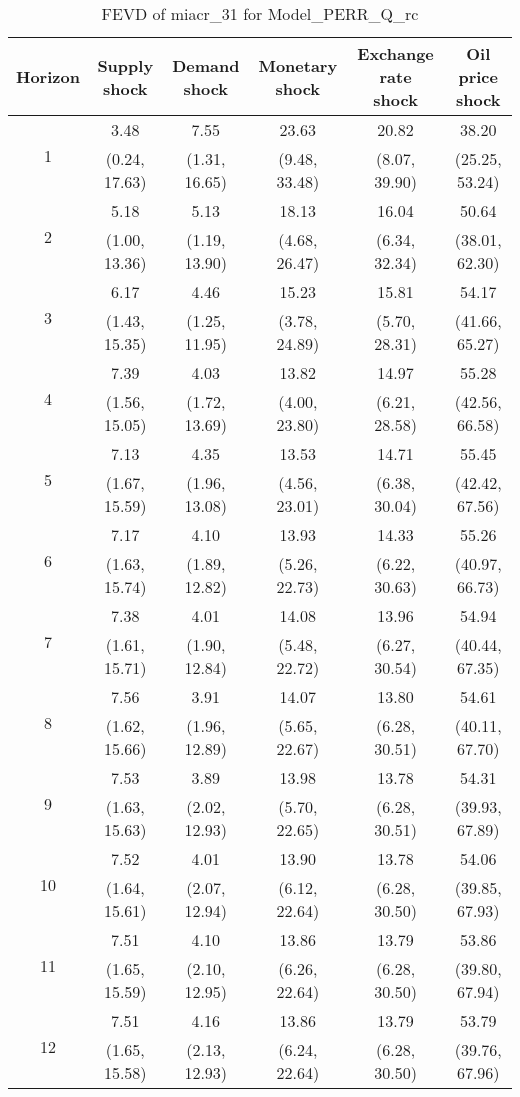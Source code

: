 \documentclass{article}
\begin{document}
\begin{table}
	\footnotesize
	\caption{FEVD of miacr_31 for Model_PERR_Q_rc}
	\begin{tabular}{cccccc}
		Horizon & Supply shock & Demand shock & Monetary shock & Exchange rate shock & Oil price shock\\ \hline
		\multirow{2}{*}{1} & 3.48 & 7.55 & 23.63 & 20.82 & 38.20\\
		 & (0.24, 17.63) & (1.31, 16.65) & (9.48, 33.48) & (8.07, 39.90) & (25.25, 53.24)\\
		\multirow{2}{*}{2} & 5.18 & 5.13 & 18.13 & 16.04 & 50.64\\
		 & (1.00, 13.36) & (1.19, 13.90) & (4.68, 26.47) & (6.34, 32.34) & (38.01, 62.30)\\
		\multirow{2}{*}{3} & 6.17 & 4.46 & 15.23 & 15.81 & 54.17\\
		 & (1.43, 15.35) & (1.25, 11.95) & (3.78, 24.89) & (5.70, 28.31) & (41.66, 65.27)\\
		\multirow{2}{*}{4} & 7.39 & 4.03 & 13.82 & 14.97 & 55.28\\
		 & (1.56, 15.05) & (1.72, 13.69) & (4.00, 23.80) & (6.21, 28.58) & (42.56, 66.58)\\
		\multirow{2}{*}{5} & 7.13 & 4.35 & 13.53 & 14.71 & 55.45\\
		 & (1.67, 15.59) & (1.96, 13.08) & (4.56, 23.01) & (6.38, 30.04) & (42.42, 67.56)\\
		\multirow{2}{*}{6} & 7.17 & 4.10 & 13.93 & 14.33 & 55.26\\
		 & (1.63, 15.74) & (1.89, 12.82) & (5.26, 22.73) & (6.22, 30.63) & (40.97, 66.73)\\
		\multirow{2}{*}{7} & 7.38 & 4.01 & 14.08 & 13.96 & 54.94\\
		 & (1.61, 15.71) & (1.90, 12.84) & (5.48, 22.72) & (6.27, 30.54) & (40.44, 67.35)\\
		\multirow{2}{*}{8} & 7.56 & 3.91 & 14.07 & 13.80 & 54.61\\
		 & (1.62, 15.66) & (1.96, 12.89) & (5.65, 22.67) & (6.28, 30.51) & (40.11, 67.70)\\
		\multirow{2}{*}{9} & 7.53 & 3.89 & 13.98 & 13.78 & 54.31\\
		 & (1.63, 15.63) & (2.02, 12.93) & (5.70, 22.65) & (6.28, 30.51) & (39.93, 67.89)\\
		\multirow{2}{*}{10} & 7.52 & 4.01 & 13.90 & 13.78 & 54.06\\
		 & (1.64, 15.61) & (2.07, 12.94) & (6.12, 22.64) & (6.28, 30.50) & (39.85, 67.93)\\
		\multirow{2}{*}{11} & 7.51 & 4.10 & 13.86 & 13.79 & 53.86\\
		 & (1.65, 15.59) & (2.10, 12.95) & (6.26, 22.64) & (6.28, 30.50) & (39.80, 67.94)\\
		\multirow{2}{*}{12} & 7.51 & 4.16 & 13.86 & 13.79 & 53.79\\
		 & (1.65, 15.58) & (2.13, 12.93) & (6.24, 22.64) & (6.28, 30.50) & (39.76, 67.96)\\
	\end{tabular}
\label{tab:fevd-Model_PERR_Q_rc-miacr_31}
\end{table}
\end{document}
